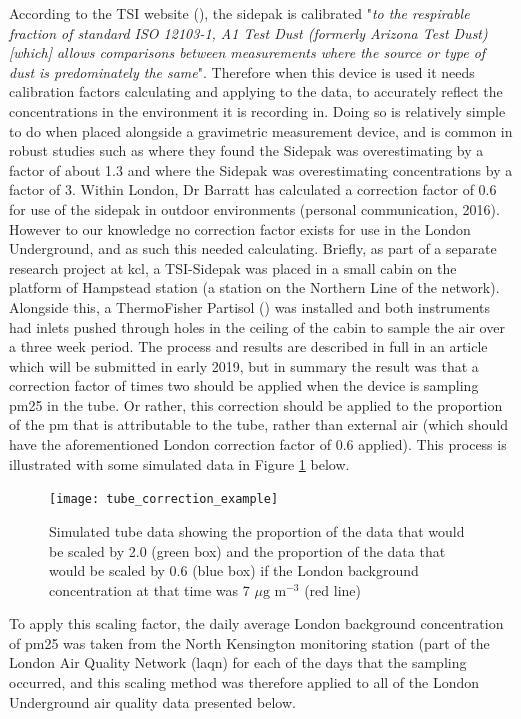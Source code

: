According to the TSI website (\cite{TSI2015}), the sidepak is calibrated "\textit{to the respirable fraction of standard ISO 12103-1, A1 Test Dust (formerly Arizona Test Dust) [which] allows comparisons between measurements where the source or type of dust is predominately the same}". Therefore when this device is used it needs calibration factors calculating and applying to the data, to accurately reflect the concentrations in the environment it is recording in. Doing so is relatively simple to do when placed alongside a gravimetric measurement device, and is common in robust studies such as \cite{Torrey2015} where they found the Sidepak was overestimating by a factor of about 1.3 and \cite{Jiang2011} where the Sidepak was overestimating concentrations by a factor of 3. Within London, Dr Barratt has calculated a correction factor of 0.6 for use of the sidepak in outdoor environments (personal communication, 2016). However to our knowledge no correction factor exists for use in the London Underground, and as such this needed calculating. Briefly, as part of a separate research project at \gls{kcl}, a TSI-Sidepak was placed in a small cabin on the platform of Hampstead station (a station on the Northern Line of the network). Alongside this, a ThermoFisher Partisol (\cite{ThermoFisherScientific2016}) was installed and both instruments had inlets pushed through holes in the ceiling of the cabin to sample the air over a three week period. The process and results are described in full in an article which will be submitted in early 2019, but in summary the result was that a correction factor of times two should be applied when the device is sampling \gls{pm25} in the tube. Or rather, this correction should be applied to the proportion of the \gls{pm} that is attributable to the tube, rather than external air (which should have the aforementioned London correction factor of 0.6 applied). This process is illustrated with some simulated data in Figure \ref{fig:tube_correction_example} below.

\begin{figure}[H]
\centering
\texttt{[image: tube\_correction\_example]}
\caption{Simulated tube data showing the proportion of the data that would be scaled by 2.0 (green box) and the proportion of the data that would be scaled by 0.6 (blue box) if the London background concentration at that time was 7 $\mu \text{g m}^{-3}$ (red line)}
\label{fig:tube_correction_example}
\end{figure}

To apply this scaling factor, the daily average London background concentration of \gls{pm25} was taken from the North Kensington monitoring station (part of the London Air Quality Network (\gls{laqn}) for each of the days that the sampling occurred, and this scaling method was therefore applied to all of the London Underground air quality data presented below.

